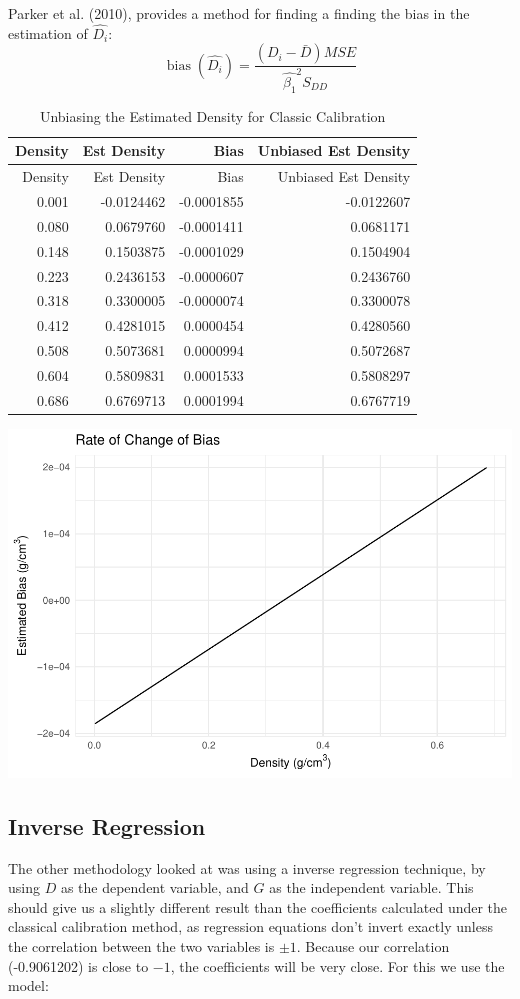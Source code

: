 \documentclass[]{article}
\begin{document}
Parker et al. (2010), provides a method for finding a finding the bias
in the estimation of \(\hat{D_{i}}\): \[
  \operatorname{bias}\left( \hat{D_{i}} \right) =
  \frac{(D_{i} - \bar{D})MSE}{\hat{\beta_{1}}^{2}S_{DD}}
\]

\begin{longtable}[]{@{}rrrr@{}}
\caption{Unbiasing the Estimated Density for Classic
Calibration}\tabularnewline
\toprule
Density & Est Density & Bias & Unbiased Est Density\tabularnewline
\midrule
\endfirsthead
\toprule
Density & Est Density & Bias & Unbiased Est Density\tabularnewline
\midrule
\endhead
0.001 & -0.0124462 & -0.0001855 & -0.0122607\tabularnewline
0.080 & 0.0679760 & -0.0001411 & 0.0681171\tabularnewline
0.148 & 0.1503875 & -0.0001029 & 0.1504904\tabularnewline
0.223 & 0.2436153 & -0.0000607 & 0.2436760\tabularnewline
0.318 & 0.3300005 & -0.0000074 & 0.3300078\tabularnewline
0.412 & 0.4281015 & 0.0000454 & 0.4280560\tabularnewline
0.508 & 0.5073681 & 0.0000994 & 0.5072687\tabularnewline
0.604 & 0.5809831 & 0.0001533 & 0.5808297\tabularnewline
0.686 & 0.6769713 & 0.0001994 & 0.6767719\tabularnewline
\bottomrule
\end{longtable}

\includegraphics{Project_05_files/figure-latex/CC Unbias-1.pdf}

\subsection{Inverse Regression}\label{inverse-regression}

The other methodology looked at was using a inverse regression
technique, by using \(D\) as the dependent variable, and \(G\) as the
independent variable. This should give us a slightly different result
than the coefficients calculated under the classical calibration method,
as regression equations don't invert exactly unless the correlation
between the two variables is \(\pm 1\). Because our correlation
(-0.9061202) is close to \(-1\), the coefficients will be very close.
For this we use the model:
\end{document}
